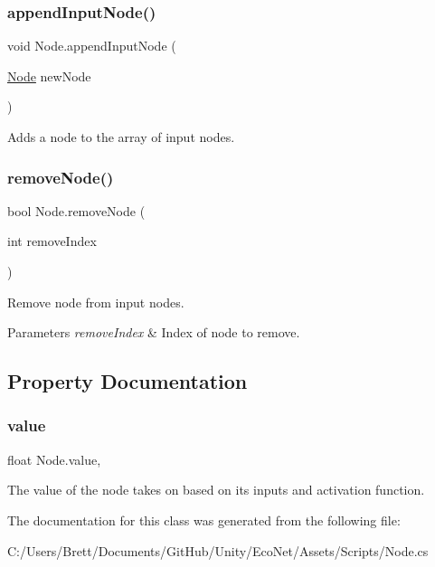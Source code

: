 \subsubsection{\texorpdfstring{append\+Input\+Node()}{appendInputNode()}}
{\footnotesize\ttfamily void Node.\+append\+Input\+Node (\begin{DoxyParamCaption}\item[{\mbox{\hyperlink{class_node}{Node}}}]{new\+Node }\end{DoxyParamCaption})}



Adds a node to the array of input nodes. 

\mbox{\label{class_node_ae35ca95be4806e6a3f81617d888f724f}} 
\subsubsection{\texorpdfstring{remove\+Node()}{removeNode()}}
{\footnotesize\ttfamily bool Node.\+remove\+Node (\begin{DoxyParamCaption}\item[{int}]{remove\+Index }\end{DoxyParamCaption})}



Remove node from input nodes. 


\begin{DoxyParams}{Parameters}
{\em remove\+Index} & Index of node to remove.\\
\hline
\end{DoxyParams}


\subsection{Property Documentation}
\mbox{\label{class_node_a4d82b89fd1d72cc0184763279a3811dc}} 
\subsubsection{\texorpdfstring{value}{value}}
{\footnotesize\ttfamily float Node.\+value\hspace{0.3cm}{\ttfamily [get]}, {\ttfamily [set]}}



The value of the node takes on based on it\textquotesingle{}s inputs and activation function. 



The documentation for this class was generated from the following file\+:\begin{DoxyCompactItemize}
\item 
C\+:/\+Users/\+Brett/\+Documents/\+Git\+Hub/\+Unity/\+Eco\+Net/\+Assets/\+Scripts/Node.\+cs\end{DoxyCompactItemize}
